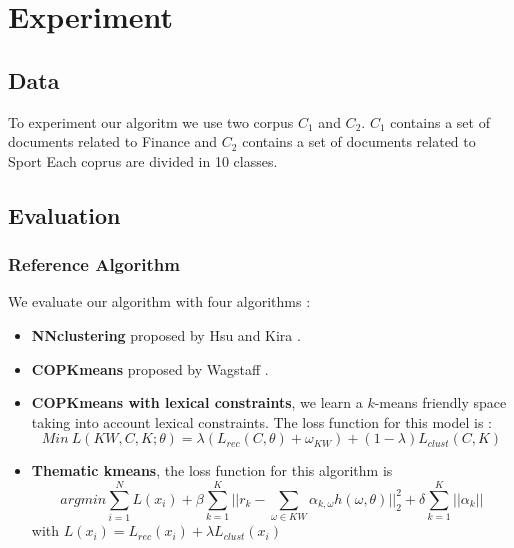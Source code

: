 \section{Experiment}

\subsection{Data}
To experiment our algoritm we use two corpus $C_1$ and $C_2$. $C_1$ contains a
set of documents related to Finance and $C_2$ contains a set of documents
related to Sport Each coprus are divided in 10 classes.

\subsection{Evaluation}
\subsubsection{Reference Algorithm}
We evaluate our algorithm with four algorithms :
\begin{itemize}
\item \textbf{NNclustering} proposed by Hsu and Kira
\cite{2015arXiv151106321H}.
\item \textbf{COPKmeans} proposed by Wagstaff \cite{Wagstaff:2001:CKC:645530.655669}.
\item \textbf{COPKmeans with lexical constraints}, we learn a $k$-means
  friendly space taking into account lexical constraints. The loss
  function for this model is :
  $$
  Min~L(KW, C, K; \theta) = \lambda(L_{rec}(C, \theta) + \omega_{KW} )+
  (1-\lambda)L_{clust}(C,K)
  $$
\item \textbf{Thematic kmeans}, the loss function for this algorithm is
  \begin{equation*}
    argmin \sum_{i=1}^{N}L(x_i) + \beta\sum_{k=1}^{K}||r_k - \sum_{\omega \in KW}
    \alpha_{k,\omega}h(\omega, \theta)||_2^2 + \delta\sum_{k=1}^{K}||\alpha_k|| 
  \end{equation*}
  with $L(x_i) = L_{rec}(x_i) + \lambda L_{clust}(x_i)$
\end{itemize}

